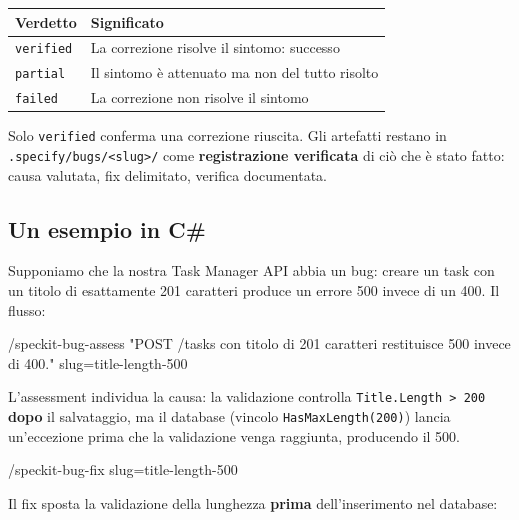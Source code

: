 \documentclass[
  italian,
  10pt,
]{book}
\newenvironment{Shaded}{\begin{snugshade}}{\end{snugshade}}
\newcommand{\NormalTok}[1]{#1}
\newcounter{none} %
\begin{document}
{\def\LTcaptype{none} %
\begin{longtable}[]{@{}ll@{}}
\toprule\noalign{}
Verdetto & Significato \\
\midrule\noalign{}
\endhead
\bottomrule\noalign{}
\endlastfoot
\texttt{verified} & La correzione risolve il sintomo: successo \\
\texttt{partial} & Il sintomo è attenuato ma non del tutto risolto \\
\texttt{failed} & La correzione non risolve il sintomo \\
\end{longtable}
}

Solo \texttt{verified} conferma una correzione riuscita. Gli artefatti
restano in \texttt{.specify/bugs/\textless{}slug\textgreater{}/} come
\textbf{registrazione verificata} di ciò che è stato fatto: causa
valutata, fix delimitato, verifica documentata.

\subsection{Un esempio in C\#}\label{un-esempio-in-c}

Supponiamo che la nostra Task Manager API abbia un bug: creare un task
con un titolo di esattamente 201 caratteri produce un errore 500 invece
di un 400. Il flusso:

\begin{Shaded}
\begin{Highlighting}[]
\NormalTok{/speckit{-}bug{-}assess "POST /tasks con titolo di 201 caratteri restituisce 500}
\NormalTok{invece di 400." slug=title{-}length{-}500}
\end{Highlighting}
\end{Shaded}

L'assessment individua la causa: la validazione controlla
\texttt{Title.Length\ \textgreater{}\ 200} \textbf{dopo} il salvataggio,
ma il database (vincolo \texttt{HasMaxLength(200)}) lancia un'eccezione
prima che la validazione venga raggiunta, producendo il 500.

\begin{Shaded}
\begin{Highlighting}[]
\NormalTok{/speckit{-}bug{-}fix slug=title{-}length{-}500}
\end{Highlighting}
\end{Shaded}

Il fix sposta la validazione della lunghezza \textbf{prima}
dell'inserimento nel database:
\end{document}
